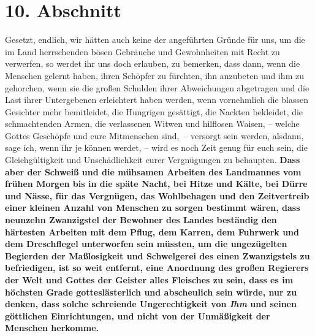 \section{10. Abschnitt} \label{kap18_ab10}

Gesetzt, endlich, wir hätten auch keine der angeführten Gründe für uns, um die
im Land herrschenden bösen Gebräuche und Gewohnheiten mit Recht zu verwerfen,
so werdet ihr uns doch erlauben, zu bemerken, dass dann, wenn die Menschen
gelernt haben, ihren Schöpfer zu fürchten, ihn anzubeten und ihm zu
gehorchen, wenn sie die großen Schulden ihrer Abweichungen abgetragen und die
Last ihrer Untergebenen erleichtert haben werden, wenn vornehmlich die blassen
Gesichter mehr bemitleidet, die Hungrigen gesättigt, die Nackten bekleidet, die
schmachtenden Armen, die verlassenen Witwen und hilflosen Waisen, -- welche
Gottes Geschöpfe und eure Mitmenschen sind,~-- versorgt sein werden, alsdann,
sage ich, wenn ihr je können werdet, -- wird es noch Zeit genug für euch sein,
die Gleichgültigkeit und Unschädlichkeit eurer Vergnügungen zu
behaupten.
\label{ref:18_10_ungeraechtikeit} \textbf{Dass aber der Schweiß und die mühsamen
Arbeiten
des Landmannes vom frühen Morgen bis in die späte Nacht, bei Hitze und Kälte,
bei Dürre und Nässe, für das Vergnügen, das Wohlbehagen und den Zeitvertreib
einer kleinen Anzahl von Menschen zu sorgen bestimmt wären, dass neunzehn
Zwanzigstel der Bewohner
des Landes beständig den härtesten Arbeiten mit dem
Pflug, dem Karren, dem Fuhrwerk und dem Dreschflegel unterworfen sein müssten,
um
die ungezügelten Begierden der Maßlosigkeit und Schwelgerei des
einen Zwanzigstels
zu befriedigen, ist so weit entfernt, eine Anordnung des großen Regierers der
Welt und Gottes der Geister alles Fleisches zu sein, dass es im höchsten Grade
gotteslästerlich und abscheulich sein würde, nur zu denken, dass solche
schreiende Ungerechtigkeit von \textit{Ihm} und seinen göttlichen Einrichtungen,
und
nicht von der Unmäßigkeit der Menschen herkomme.}
